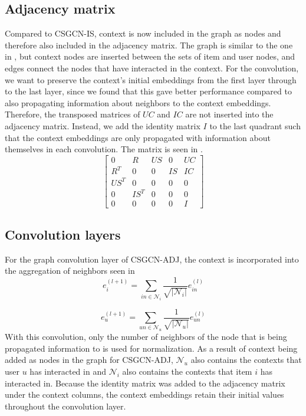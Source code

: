 \subsection{Adjacency matrix}\label{subsec:csgcn_adj_adj_mat}
Compared to CSGCN-IS, context is now included in the graph as nodes and therefore also included in the adjacency matrix.
The graph is similar to the one in , but context nodes are inserted between the sets of item and user nodes, and edges connect the nodes that have interacted in the context.
For the convolution, we want to preserve the context's initial embeddings from the first layer through to the last layer, since we found that this gave better performance compared to also propagating information about neighbors to the context embeddings.
Therefore, the transposed matrices of $UC$ and $IC$ are not inserted into the adjacency matrix.
Instead, we add the identity matrix $I$ to the last quadrant such that the context embeddings are only propagated with information about themselves in each convolution.
The matrix is seen in .
\begin{equation}\label{csgcn_adj_adj_mat}
    \begin{bmatrix}
    0 & R & US & 0 & UC\\
    R^T & 0 & 0 & IS & IC\\
    US^T & 0 & 0 & 0 & 0\\
    0 & IS^T & 0 & 0 & 0 \\
    0 & 0 & 0 & 0 & I
    \end{bmatrix}
\end{equation}

\subsection{Convolution layers}\label{subsec:csgcn_adj_conv_layer}
For the graph convolution layer of CSGCN-ADJ, the context is incorporated into the aggregation of neighbors seen in 
\begin{equation}\label{eq:csgcn_adj_gc_layer_item}
    e_{i}^{(l+1)}=\sum_{in\in \mathcal{N}_{i}}\frac{1}{\sqrt{|\mathcal{N}_{i}|} }e_{in}^{(l)}
\end{equation}

\begin{equation}\label{eq:csgcn_adj_gc_layer_user}
     e_{u}^{(l+1)}=\sum_{un\in \mathcal{N}_{u}}\frac{1}{ \sqrt{|\mathcal{N}_{u}|}}e_{un}^{(l)}
\end{equation}
With this convolution, only the number of neighbors of the node that is being propagated information to is used for normalization.
As a result of context being added as nodes in the graph for CSGCN-ADJ, $\mathcal{N}_{u}$ also contains the contexts that user $u$ has interacted in and $\mathcal{N}_{i}$ also contains the contexts that item $i$ has interacted in.
Because the identity matrix was added to the adjacency matrix under the context columns, the context embeddings retain their initial values throughout the convolution layer.

